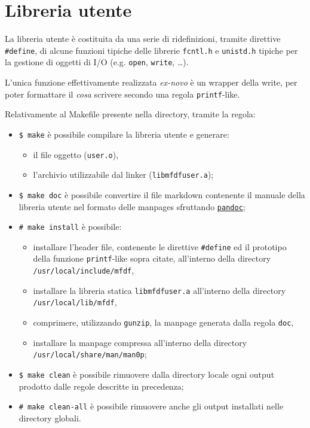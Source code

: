 \documentclass{article}
\newcommand{\terminal}[1]{\colorbox{tn-bg}{\textcolor{tn-fg}{\texttt{#1}}}}
\begin{document}
\section{Libreria utente}
La libreria utente è costituita da una serie di ridefinizioni, tramite direttive \texttt{\#define}, di alcune funzioni tipiche delle librerie \texttt{fcntl.h} e \texttt{unistd.h} tipiche per la gestione di oggetti di I/O (e.g. \texttt{open}, \texttt{write}, \dots).

L'unica funzione effettivamente realizzata \textit{ex-novo} è un wrapper della write, per poter formattare il \textit{cosa} scrivere secondo una regola \texttt{printf}-like.

Relativamente al Makefile presente nella directory, tramite la regola:
\begin{itemize}
        \item \terminal{\$ make} è possibile compilare la libreria utente e generare:
                \begin{itemize}
                        \item il file oggetto (\texttt{user.o}),
                        \item l'archivio utilizzabile dal linker (\texttt{libmfdfuser.a});
                \end{itemize}
        \item \terminal{\$ make doc} è possibile convertire il file markdown contenente il manuale della libreria utente nel formato delle manpages sfruttando \href{https://pandoc.org/}{\texttt{pandoc}};
        \item \terminal{\# make install} è possibile:
                \begin{itemize}
                        \item installare l'header file, contenente le direttive \texttt{\#define} ed il prototipo della funzione \texttt{printf}-like sopra citate, all'interno della directory \texttt{/usr/local/include/mfdf},
                        \item installare la libreria statica \texttt{libmfdfuser.a} all'interno della directory \texttt{/usr/local/lib/mfdf},
                        \item comprimere, utilizzando \texttt{gunzip}, la manpage generata dalla regola \texttt{doc},
                        \item installare la manpage compressa all'interno della directory \texttt{/usr/local/share/man/man0p};
                \end{itemize}
        \item \terminal{\$ make clean} è possibile rimuovere dalla directory locale ogni output prodotto dalle regole descritte in precedenza;
        \item \terminal{\# make clean-all} è possibile rimuovere anche gli output installati nelle directory globali.
\end{itemize}
\end{document}
